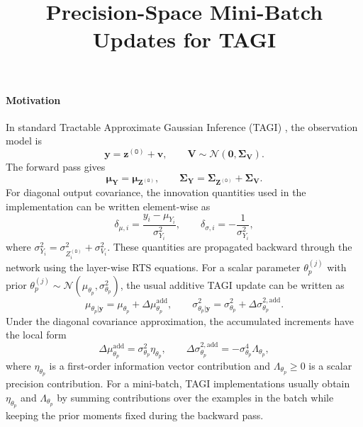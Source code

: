 \documentclass[11pt]{article}
\title{Precision-Space Mini-Batch Updates for TAGI}
\author{}
\date{}
\begin{document}
\maketitle

\paragraph{Motivation}
In standard Tractable Approximate Gaussian Inference (TAGI)
\cite{goulet2021tractable}, the observation model is
\begin{equation}
    \bm{y} = \bm{z}^{(\mathtt{O})} + \bm{v},
    \qquad
    \bm{V} \sim \mathcal{N}(\bm{0},\bm{\Sigma}_{\bm{V}}).
    \label{eq:obs-model}
\end{equation}
The forward pass gives
\begin{equation}
    \bm{\mu}_{\bm{Y}} = \bm{\mu}_{\bm{Z}^{(\mathtt{O})}},
    \qquad
    \bm{\Sigma}_{\bm{Y}}
    =
    \bm{\Sigma}_{\bm{Z}^{(\mathtt{O})}} + \bm{\Sigma}_{\bm{V}}.
    \label{eq:predictive-y}
\end{equation}
For diagonal output covariance, the innovation quantities used in the
implementation can be written element-wise as
\begin{equation}
    \delta_{\mu,i}
    =
    \frac{y_i-\mu_{Y_i}}{\sigma^2_{Y_i}},
    \qquad
    \delta_{\sigma,i}
    =
    -\frac{1}{\sigma^2_{Y_i}},
    \label{eq:output-innovation}
\end{equation}
where
\(
\sigma^2_{Y_i}
=
\sigma^2_{Z^{(\mathtt{O})}_i}+\sigma^2_{V_i}.
\)
These quantities are propagated backward through the network using the
layer-wise RTS equations. For a scalar parameter
\(
\theta_p^{(j)}
\)
with prior
\(
\theta_p^{(j)} \sim
\mathcal{N}(\mu_{\theta_p},\sigma^2_{\theta_p})
\),
the usual additive TAGI update can be written as
\begin{equation}
    \mu_{\theta_p|\bm{y}}
    =
    \mu_{\theta_p}
    +
    \Delta \mu_{\theta_p}^{\mathrm{add}},
    \qquad
    \sigma^2_{\theta_p|\bm{y}}
    =
    \sigma^2_{\theta_p}
    +
    \Delta \sigma_{\theta_p}^{2,\mathrm{add}}.
    \label{eq:additive-tagi-update}
\end{equation}
Under the diagonal covariance approximation, the accumulated increments have
the local form
\begin{equation}
    \Delta \mu_{\theta_p}^{\mathrm{add}}
    =
    \sigma^2_{\theta_p}\eta_{\theta_p},
    \qquad
    \Delta \sigma_{\theta_p}^{2,\mathrm{add}}
    =
    -\sigma^4_{\theta_p}\Lambda_{\theta_p},
    \label{eq:additive-natural-form}
\end{equation}
where
\(
\eta_{\theta_p}
\)
is a first-order information vector contribution and
\(
\Lambda_{\theta_p}\geq 0
\)
is a scalar precision contribution. For a mini-batch, TAGI implementations
usually obtain
\(
\eta_{\theta_p}
\)
and
\(
\Lambda_{\theta_p}
\)
by summing contributions over the examples in the batch while keeping the
prior moments fixed during the backward pass.
\end{document}
